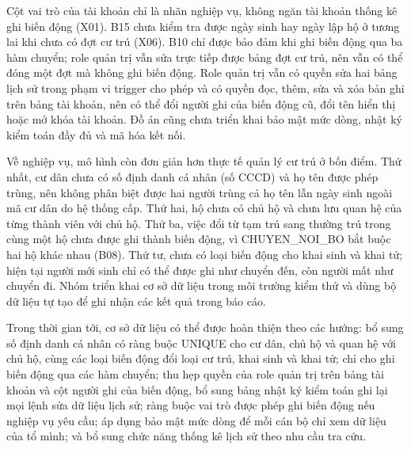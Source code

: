 Cột vai trò của tài khoản chỉ là nhãn nghiệp vụ, không ngăn tài khoản thống kê ghi biến động (X01). B15 chưa kiểm tra được ngày sinh hay ngày lập hộ ở tương lai khi chưa có đợt cư trú (X06). B10 chỉ được bảo đảm khi ghi biến động qua ba hàm chuyển; role quản trị vẫn sửa trực tiếp được bảng đợt cư trú, nên vẫn có thể đóng một đợt mà không ghi biến động. Role quản trị vẫn có quyền sửa hai bảng lịch sử trong phạm vi trigger cho phép và có quyền đọc, thêm, sửa và xóa bản ghi trên bảng tài khoản, nên có thể đổi người ghi của biến động cũ, đổi tên hiển thị hoặc mở khóa tài khoản. Đồ án cũng chưa triển khai bảo mật mức dòng, nhật ký kiểm toán đầy đủ và mã hóa kết nối.

Về nghiệp vụ, mô hình còn đơn giản hơn thực tế quản lý cư trú ở bốn điểm. Thứ nhất, cư dân chưa có số định danh cá nhân (số CCCD) và họ tên được phép trùng, nên không phân biệt được hai người trùng cả họ tên lẫn ngày sinh ngoài mã cư dân do hệ thống cấp. Thứ hai, hộ chưa có chủ hộ và chưa lưu quan hệ của từng thành viên với chủ hộ. Thứ ba, việc đổi từ tạm trú sang thường trú trong cùng một hộ chưa được ghi thành biến động, vì CHUYEN\_NOI\_BO bắt buộc hai hộ khác nhau (B08). Thứ tư, chưa có loại biến động cho khai sinh và khai tử; hiện tại người mới sinh chỉ có thể được ghi như chuyển đến, còn người mất như chuyển đi. Nhóm triển khai cơ sở dữ liệu trong môi trường kiểm thử và dùng bộ dữ liệu tự tạo để ghi nhận các kết quả trong báo cáo.

Trong thời gian tới, cơ sở dữ liệu có thể được hoàn thiện theo các hướng: bổ sung số định danh cá nhân có ràng buộc UNIQUE cho cư dân, chủ hộ và quan hệ với chủ hộ, cùng các loại biến động đổi loại cư trú, khai sinh và khai tử; chỉ cho ghi biến động qua các hàm chuyển; thu hẹp quyền của role quản trị trên bảng tài khoản và cột người ghi của biến động, bổ sung bảng nhật ký kiểm toán ghi lại mọi lệnh sửa dữ liệu lịch sử; ràng buộc vai trò được phép ghi biến động nếu nghiệp vụ yêu cầu; áp dụng bảo mật mức dòng để mỗi cán bộ chỉ xem dữ liệu của tổ mình; và bổ sung chức năng thống kê lịch sử theo nhu cầu tra cứu.
